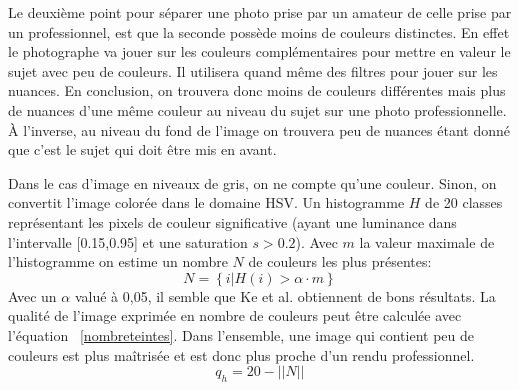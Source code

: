 \documentclass[11pt, french]{report-rd-info}
\begin{document}
\begin{description}
Le deuxième point pour séparer une photo prise par un amateur de celle prise par un professionnel, est que la seconde possède moins de couleurs distinctes. En effet le photographe va jouer sur les couleurs complémentaires pour mettre en valeur le sujet avec peu de couleurs. Il utilisera quand même des filtres pour jouer sur les nuances. En conclusion, on trouvera donc moins de couleurs différentes mais plus de nuances d’une même couleur au niveau du sujet sur une photo professionnelle. À l’inverse, au niveau du fond de l’image on trouvera peu de nuances étant donné que c’est le sujet qui doit être mis en avant.

Dans le cas d'image en niveaux de gris, on ne compte qu'une couleur. Sinon, on convertit l'image colorée dans le domaine HSV. Un histogramme $H$ de 20 classes représentant les pixels de couleur significative (ayant une luminance dans l'intervalle [0.15,0.95] et une saturation $s > 0.2$). Avec $m$ la valeur maximale de l'histogramme on estime un nombre $N$ de couleurs les plus présentes: 
\begin{equation}
N = \left\{i|H(i)>\alpha \cdot m\right\}
\end{equation}
Avec un $\alpha$ valué à 0,05, il semble que Ke et al. \cite{Ke} obtiennent de bons résultats. La qualité de l'image exprimée en nombre de couleurs peut être calculée avec l'équation ~\ref{nombreteintes}. Dans l'ensemble, une image qui contient peu de couleurs est plus maîtrisée et est donc plus proche d'un rendu professionnel. 
\begin{equation}
q_h = 20 - ||N||
\label{nombreteintes}
\end{equation}


\end{description}
\end{document}
